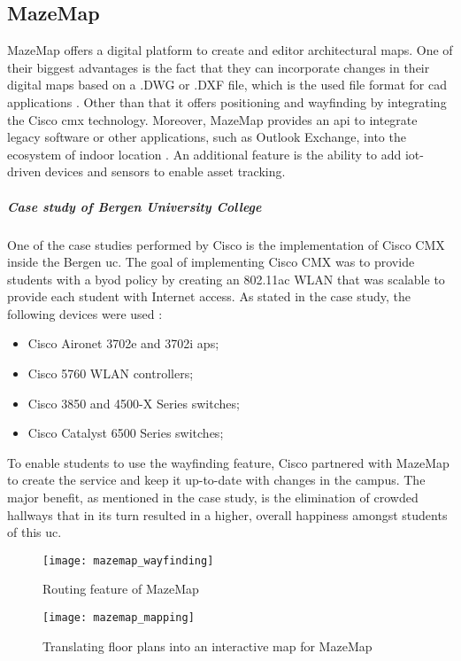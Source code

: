 \subsection{MazeMap}
MazeMap offers a digital platform to create and editor architectural maps. One of their biggest advantages is the fact that they can incorporate changes in their digital maps based on a .DWG or .DXF file, which is the used file format for \acrfull{cad} applications \cite{Coon2015}. Other than that it offers positioning and wayfinding by integrating the Cisco \acrlong{cmx} technology. Moreover, MazeMap provides an \acrshort{api} to integrate legacy software or other applications, such as Outlook Exchange, into the ecosystem of indoor location \cite{MazeMapb} \cite{MazeMapa}. An additional feature is the ability to add \acrfull{iot}-driven devices and sensors to enable asset tracking.
\subparagraph{Case study of Bergen University College}
One of the case studies performed by Cisco is the implementation of Cisco CMX inside the Bergen \acrshort{uc}. The goal of implementing Cisco CMX was to provide students with a \acrfull{byod} policy by creating an 802.11ac WLAN that was scalable to provide each student with Internet access. As stated in the case study, the following devices were used \cite{Magrane2016}:
\begin{itemize}
\item Cisco Aironet 3702e and 3702i \acrlong{ap}s;
\item Cisco 5760 WLAN controllers;
\item Cisco 3850 and 4500-X Series switches;
\item Cisco Catalyst 6500 Series switches;
\end{itemize}
To enable students to use the wayfinding feature, Cisco partnered with MazeMap to create the service and keep it up-to-date with changes in the campus. The major benefit, as mentioned in the case study, is the elimination of crowded hallways that in its turn resulted in a higher, overall happiness amongst students of this \acrlong{uc}.
\begin{figure}[h!]
\centering
\texttt{[image: mazemap\_wayfinding]}
\caption{Routing feature of MazeMap ~\cite{MazeMapa}}
\label{fig:ips_topologies}
\end{figure}
\begin{figure}[h!]
\centering
\texttt{[image: mazemap\_mapping]}
\caption{Translating floor plans into an interactive map for MazeMap ~\cite{MazeMap}}
\label{fig:ips_topologies}
\end{figure}
